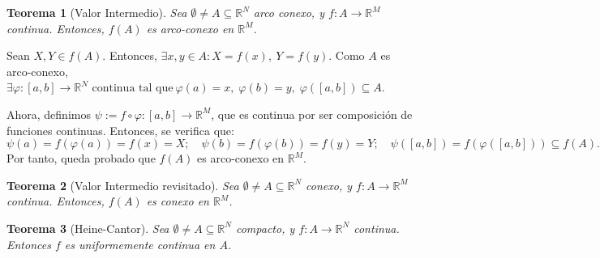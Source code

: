 \documentclass[11pt, a4paper, titlepage]{article}
\makeatletter
\renewenvironment{proof}[1][\proofname] {\vspace{-15pt}\par\pushQED{\qed}\normalfont\topsep6\p@\@plus6\p@\relax\trivlist\item[\hskip\labelsep\it#1\@addpunct{.}]\ignorespaces}{\popQED\endtrivlist\@endpefalse}
\theoremstyle{theorem-style}
\newtheorem*{nth}{Teorema}
\theoremstyle{definition-style}
\theoremstyle{remark-style}
\theoremstyle{example-style}
\makeatother
\begin{document}
\begin{nth}[Valor Intermedio]
Sea $\emptyset \ne A \subseteq \mathbb{R}^N$ arco conexo, y $f: A \longrightarrow \mathbb{R}^M$ continua. Entonces, $f(A)$ es arco-conexo en $\mathbb{R}^M$.
\end{nth}

\begin{proof}
Sean $X,Y\in f(A)$. Entonces, $\exists x,y \in A : X=f(x), \ Y=f(y)$. Como $A$ es arco-conexo, $\exists\varphi : [a,b]\longrightarrow \mathbb{R}^N \text{ continua tal que}\ \varphi(a) = x,\; \varphi(b)=y,\; \varphi([a,b]) \subseteq A$.


Ahora, definimos $\psi := f\circ \varphi : [a,b] \longrightarrow \mathbb{R}^M$, que es continua por ser composición de funciones continuas. Entonces, se verifica que: $$\psi(a) = f(\varphi(a)) = f(x) = X;\quad \psi(b)= f(\varphi(b)) = f(y) = Y;\quad \psi([a,b]) = f(\varphi([a,b])) \subseteq f(A).$$
Por tanto, queda probado que $f(A)$ es arco-conexo en $\mathbb{R}^M$.
\end{proof}



\begin{nth}[Valor Intermedio revisitado]
Sea $\emptyset \ne A\subseteq \mathbb{R}^N$ conexo, y $f:A \longrightarrow \mathbb{R}^M$ continua. Entonces, $f(A)$ es conexo en $\mathbb{R}^M$.
\end{nth}

\begin{nth}[Heine-Cantor]
	Sea $\emptyset\ne A \subseteq \mathbb{R}^N$ compacto, y $f : A \longrightarrow \mathbb{R}^N$ continua. Entonces $f$ es uniformemente continua en $A$.
\end{nth}
\end{document}
